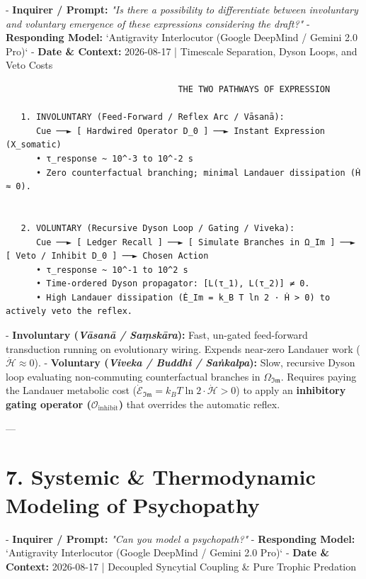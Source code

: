 \documentclass[11pt,a4paper]{article}
\theoremstyle{definition}
\theoremstyle{remark}
\begin{document}
- \textbf{Inquirer / Prompt:} \textit{"Is there a possibility to differentiate between involuntary and voluntary emergence of these expressions considering the draft?"}
- \textbf{Responding Model:} `Antigravity Interlocutor (Google DeepMind / Gemini 2.0 Pro)`
- \textbf{Date \& Context:} 2026-08-17 | Timescale Separation, Dyson Loops, and Veto Costs

\begin{verbatim}
                                  THE TWO PATHWAYS OF EXPRESSION
                                  
   1. INVOLUNTARY (Feed-Forward / Reflex Arc / Vāsanā):
      Cue ──► [ Hardwired Operator D_0 ] ──► Instant Expression (X_somatic)
      • τ_response ~ 10^-3 to 10^-2 s
      • Zero counterfactual branching; minimal Landauer dissipation (Ḣ ≈ 0).


   2. VOLUNTARY (Recursive Dyson Loop / Gating / Viveka):
      Cue ──► [ Ledger Recall ] ──► [ Simulate Branches in Ω_Im ] ──► [ Veto / Inhibit D_0 ] ──► Chosen Action
      • τ_response ~ 10^-1 to 10^2 s
      • Time-ordered Dyson propagator: [L(τ_1), L(τ_2)] ≠ 0.
      • High Landauer dissipation (Ė_Im = k_B T ln 2 · Ḣ > 0) to actively veto the reflex.
\end{verbatim}

- \textbf{Involuntary (\textit{Vāsanā / Saṃskāra}):} Fast, un-gated feed-forward transduction running on evolutionary wiring. Expends near-zero Landauer work ($\dot{\mathcal{H}} \approx 0$).
- \textbf{Voluntary (\textit{Viveka / Buddhi / Saṅkalpa}):} Slow, recursive Dyson loop evaluating non-commuting counterfactual branches in $\Omega_{\mathfrak{Im}}$. Requires paying the Landauer metabolic cost ($\dot{\mathcal{E}}_{\mathfrak{Im}} = k_B T \ln 2 \cdot \dot{\mathcal{H}} > 0$) to apply an \textbf{inhibitory gating operator ($\mathcal{O}_{\text{inhibit}}$)} that overrides the automatic reflex.

---

\section{7. Systemic \& Thermodynamic Modeling of Psychopathy}

- \textbf{Inquirer / Prompt:} \textit{"Can you model a psychopath?"}
- \textbf{Responding Model:} `Antigravity Interlocutor (Google DeepMind / Gemini 2.0 Pro)`
- \textbf{Date \& Context:} 2026-08-17 | Decoupled Syncytial Coupling \& Pure Trophic Predation
\end{document}
